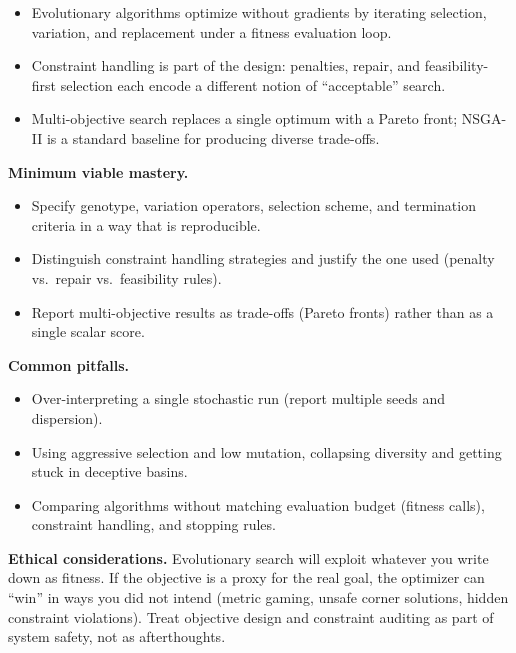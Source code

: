 \begin{tcolorbox}[summarybox, title={Key takeaways}]
\begin{itemize}
    \item Evolutionary algorithms optimize without gradients by iterating selection, variation, and replacement under a fitness evaluation loop.
    \item Constraint handling is part of the design: penalties, repair, and feasibility-first selection each encode a different notion of ``acceptable'' search.
    \item Multi-objective search replaces a single optimum with a Pareto front; NSGA-II is a standard baseline for producing diverse trade-offs.
\end{itemize}

\medskip
\noindent\textbf{Minimum viable mastery.}
\begin{itemize}
    \item Specify genotype, variation operators, selection scheme, and termination criteria in a way that is reproducible.
    \item Distinguish constraint handling strategies and justify the one used (penalty vs.\ repair vs.\ feasibility rules).
    \item Report multi-objective results as trade-offs (Pareto fronts) rather than as a single scalar score.
\end{itemize}

\noindent\textbf{Common pitfalls.}
\begin{itemize}
    \item Over-interpreting a single stochastic run (report multiple seeds and dispersion).
    \item Using aggressive selection and low mutation, collapsing diversity and getting stuck in deceptive basins.
    \item Comparing algorithms without matching evaluation budget (fitness calls), constraint handling, and stopping rules.
\end{itemize}

\medskip
\noindent\textbf{Ethical considerations.} Evolutionary search will exploit whatever you write down as fitness. If the objective is a proxy for the real goal, the optimizer can ``win'' in ways you did not intend (metric gaming, unsafe corner solutions, hidden constraint violations). Treat objective design and constraint auditing as part of system safety, not as afterthoughts.
\end{tcolorbox}

